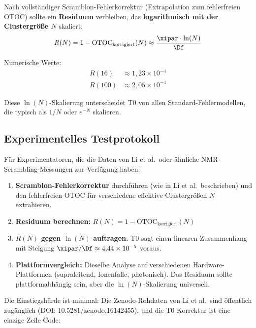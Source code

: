 \begin{experimentbox}
	Nach vollständiger Scramblon-Fehlerkorrektur (Extrapolation zum fehlerfreien OTOC) sollte ein \textbf{Residuum} verbleiben, das \textbf{logarithmisch mit der Clustergröße $N$} skaliert:
	\begin{equation}
		R(N) = 1 - \text{OTOC}_{\text{korrigiert}}(N) \approx \frac{\xipar \cdot \ln(N)}{\Df}
		\label{eq:residuum}
	\end{equation}
	
	Numerische Werte:
	\begin{align}
		R(16) &\approx 1{,}23 \times 10^{-4} \\
		R(100) &\approx 2{,}05 \times 10^{-4}
	\end{align}
	
	Diese $\ln(N)$-Skalierung unterscheidet T0 von allen Standard-Fehlermodellen, die typisch als $1/N$ oder $e^{-N}$ skalieren.
\end{experimentbox}

\subsection{Experimentelles Testprotokoll}

Für Experimentatoren, die die Daten von Li et al.\ oder ähnliche NMR-Scrambling-Messungen zur Verfügung haben:

\begin{enumerate}
	\item \textbf{Scramblon-Fehlerkorrektur} durchführen (wie in Li et al.\ beschrieben) und den fehlerfreien OTOC für verschiedene effektive Clustergrößen $N$ extrahieren.
	\item \textbf{Residuum berechnen:} $R(N) = 1 - \text{OTOC}_{\text{korrigiert}}(N)$
	\item \textbf{$R(N)$ gegen $\ln(N)$ auftragen.} T0 sagt einen linearen Zusammenhang mit Steigung $\xipar/\Df \approx 4{,}44 \times 10^{-5}$ voraus.
	\item \textbf{Plattformvergleich:} Dieselbe Analyse auf verschiedenen Hardware-Plattformen (supraleitend, Ionenfalle, photonisch). Das Residuum sollte plattformabhängig sein, aber die $\ln(N)$-Skalierung universell.
\end{enumerate}

Die Einstiegshürde ist minimal: Die Zenodo-Rohdaten von Li et al.\ sind öffentlich zugänglich (DOI: 10.5281/zenodo.16142455), und die T0-Korrektur ist eine einzige Zeile Code:

